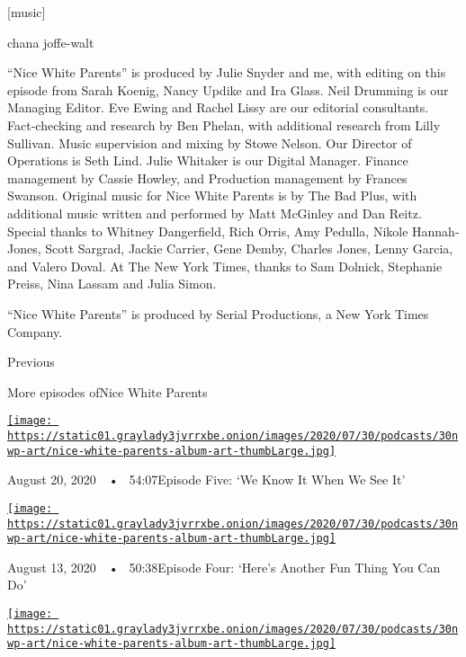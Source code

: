 {[}music{]}

chana joffe-walt

``Nice White Parents'' is produced by Julie Snyder and me, with editing
on this episode from Sarah Koenig, Nancy Updike and Ira Glass. Neil
Drumming is our Managing Editor. Eve Ewing and Rachel Lissy are our
editorial consultants. Fact-checking and research by Ben Phelan, with
additional research from Lilly Sullivan. Music supervision and mixing by
Stowe Nelson. Our Director of Operations is Seth Lind. Julie Whitaker is
our Digital Manager. Finance management by Cassie Howley, and Production
management by Frances Swanson. Original music for Nice White Parents is
by The Bad Plus, with additional music written and performed by Matt
McGinley and Dan Reitz. Special thanks to Whitney Dangerfield, Rich
Orris, Amy Pedulla, Nikole Hannah-Jones, Scott Sargrad, Jackie Carrier,
Gene Demby, Charles Jones, Lenny Garcia, and Valero Doval. At The New
York Times, thanks to Sam Dolnick, Stephanie Preiss, Nina Lassam and
Julia Simon.

``Nice White Parents'' is produced by Serial Productions, a New York
Times Company.

Previous

More episodes ofNice White Parents

\href{https://www.nytimes3xbfgragh.onion/2020/08/20/podcasts/nice-white-parents-school.html?action=click\&module=audio-series-bar\&region=header\&pgtype=Article}{\texttt{[image: https://static01.graylady3jvrrxbe.onion/images/2020/07/30/podcasts/30nwp-art/nice-white-parents-album-art-thumbLarge.jpg]}}

August 20, 2020~~•~ 54:07Episode Five: `We Know It When We See It'

\href{https://www.nytimes3xbfgragh.onion/2020/08/13/podcasts/nice-white-parents-school.html?action=click\&module=audio-series-bar\&region=header\&pgtype=Article}{\texttt{[image: https://static01.graylady3jvrrxbe.onion/images/2020/07/30/podcasts/30nwp-art/nice-white-parents-album-art-thumbLarge.jpg]}}

August 13, 2020~~•~ 50:38Episode Four: `Here's Another Fun Thing You Can
Do'

\href{https://www.nytimes3xbfgragh.onion/2020/08/06/podcasts/episode-three-this-is-our-school-how-dare-you.html?action=click\&module=audio-series-bar\&region=header\&pgtype=Article}{\texttt{[image: https://static01.graylady3jvrrxbe.onion/images/2020/07/30/podcasts/30nwp-art/nice-white-parents-album-art-thumbLarge.jpg]}}

